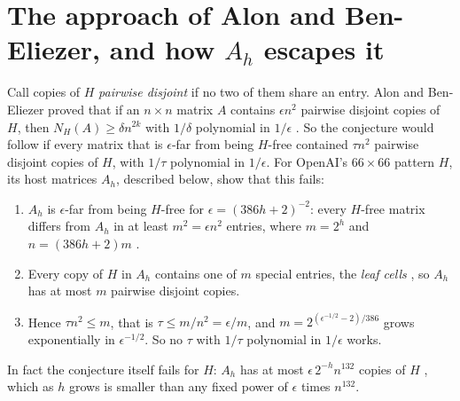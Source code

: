 \documentclass{article}
\theoremstyle{plain}
\theoremstyle{definition}
\begin{document}
\section*{The approach of Alon and Ben-Eliezer, and how $A_h$ escapes it}
  Call copies of $H$ \emph{pairwise disjoint} if no two of them share an entry.
  Alon and Ben-Eliezer proved that if an $n \times n$ matrix $A$ contains
  $\epsilon n^2$ pairwise disjoint copies of $H$, then $N_H(A) \ge \delta n^{2k}$
  with $1/\delta$ polynomial in $1/\epsilon$ \cite[Theorem~1.2]{ABE}. So the
  conjecture would follow if every matrix that is $\epsilon$-far from being
  $H$-free contained $\tau n^2$ pairwise disjoint copies of $H$, with $1/\tau$
  polynomial in $1/\epsilon$. For OpenAI's $66 \times 66$ pattern $H$, its host
  matrices $A_h$, described below, show that this fails:
  \begin{enumerate}
  \item $A_h$ is $\epsilon$-far from being $H$-free for $\epsilon = (386h+2)^{-2}$:
  every $H$-free matrix differs from $A_h$ in at least $m^2 = \epsilon n^2$
  entries, where $m = 2^h$ and $n = (386h+2)m$ \cite[Proposition~3.1]{openai}.
  \item Every copy of $H$ in $A_h$ contains one of $m$ special entries, the
  \emph{leaf cells} \cite[Proposition~4.6]{openai}, so $A_h$ has at most $m$
  pairwise disjoint copies.
  \item Hence $\tau n^2 \le m$, that is $\tau \le m/n^2 = \epsilon/m$, and
  $m = 2^{(\epsilon^{-1/2}-2)/386}$ grows exponentially in $\epsilon^{-1/2}$.
  So no $\tau$ with $1/\tau$ polynomial in $1/\epsilon$ works.
  \end{enumerate}
  In fact the conjecture itself fails for $H$: $A_h$ has at most
  $\epsilon\, 2^{-h} n^{132}$ copies of $H$ \cite[Proposition~4.6]{openai},
  which as $h$ grows is smaller than any fixed power of $\epsilon$ times $n^{132}$.
\end{document}
